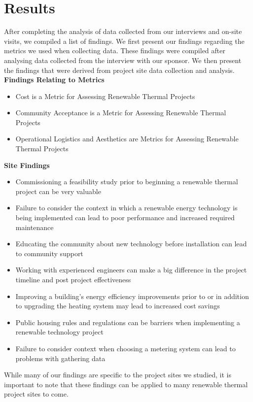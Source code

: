 \section*{Results}
\par After completing the analysis of data collected from our interviews and on-site visits, we compiled a list of findings. We first present our findings regarding the metrics we used when collecting data. These findings were compiled after analysing data collected from the interview with our sponsor. We then present the findings that were derived from project site data collection and analysis.\\

\noindent
\textbf{Findings Relating to Metrics}
\begin{itemize}
  \item{Cost is a Metric for Assessing Renewable Thermal Projects}
  \item{Community Acceptance is a Metric for Assessing Renewable Thermal Projects}
  \item{Operational Logistics and Aesthetics are Metrics for Assessing Renewable Thermal Projects}
\end{itemize}

\noindent
\textbf{Site Findings}
\begin{itemize}
  \item{Commissioning a feasibility study prior to beginning a renewable thermal project can be very valuable}
  \item{Failure to consider the context in which a renewable energy technology is being implemented can lead to poor performance and increased required maintenance}
  \item{Educating the community about new technology before installation can lead to community support}
  \item{Working with experienced engineers can make a big difference in the project timeline and post project effectiveness}
  \item{Improving a building’s energy efficiency improvements prior to or in addition to upgrading the heating system may lead to increased cost savings}
  \item{Public housing rules and regulations can be barriers when implementing a renewable technology project}
  \item{Failure to consider context when choosing a metering system can lead to problems with gathering data}
\end{itemize}
\par While many of our findings are specific to the project sites we studied, it is important to note that these findings can be applied to many renewable thermal project sites to come.

